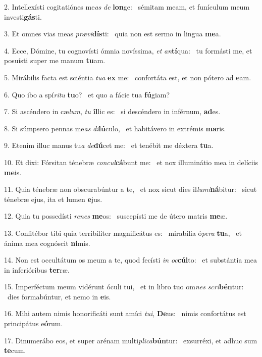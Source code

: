 2. Intellexísti cogitatiónes me\textit{as} \textit{de} \textbf{lon}ge: \ast\  sémitam meam, et funículum meum investi\textbf{gás}ti.\

3. Et omnes vias meas \textit{præ}\textit{vi}\textbf{dís}ti: \ast\  quia non est sermo in lingua \textbf{me}a.\

4. Ecce, Dómine, tu cognovísti ómnia novíssima, \textit{et} \textit{an}\textbf{tí}qua: \ast\  tu formásti me, et posuísti super me manum \textbf{tu}am.\

5. Mirábilis facta est sciéntia \textit{tu}\textit{a} \textbf{ex} me: \ast\  confortáta est, et non pótero ad \textbf{e}am.\

6. Quo ibo a spí\textit{ri}\textit{tu} \textbf{tu}o? \ast\  et quo a fácie tua \textbf{fú}giam?\

7. Si ascéndero in cæ\textit{lum}, \textit{tu} \textbf{il}lic es: \ast\  si descéndero in inférnum, \textbf{ad}es.\

8. Si súmpsero pennas me\textit{as} \textit{di}\textbf{lú}culo, \ast\  et habitávero in extrémis \textbf{ma}ris.\

9. Etenim illuc manus tu\textit{a} \textit{de}\textbf{dú}cet me: \ast\  et tenébit me déxtera \textbf{tu}a.\

10. Et dixi: Fórsitan ténebræ \textit{con}\textit{cul}\textbf{cá}bunt me: \ast\  et nox illuminátio mea in delíciis \textbf{me}is.\

11. Quia ténebræ non obscurabúntur a te, \dag\  et nox sicut dies il\textit{lu}\textit{mi}\textbf{ná}bitur: \ast\  sicut ténebræ ejus, ita et lumen \textbf{e}jus.\

12. Quia tu possedísti \textit{re}\textit{nes} \textbf{me}os: \ast\  suscepísti me de útero matris \textbf{me}æ.\

13. Confitébor tibi quia terribíliter magnificátus es: \dag\  mirabília ó\textit{pe}\textit{ra} \textbf{tu}a, \ast\  et ánima mea cognóscit \textbf{ni}mis.\

14. Non est occultátum os meum a te, quod fecísti \textit{in} \textit{oc}\textbf{cúl}to: \ast\  et substántia mea in inferióribus \textbf{ter}ræ.\

15. Imperféctum meum vidérunt óculi tui, \dag\  et in libro tuo om\textit{nes} \textit{scri}\textbf{bén}tur: \ast\  dies formabúntur, et nemo in \textbf{e}is.\

16. Mihi autem nimis honorificáti sunt amíci \textit{tu}\textit{i}, \textbf{De}us: \ast\  nimis confortátus est principátus e\textbf{ó}rum.\

17. Dinumerábo eos, et super arénam multi\textit{pli}\textit{ca}\textbf{bún}tur: \ast\  exsurréxi, et adhuc sum \textbf{te}cum.\

